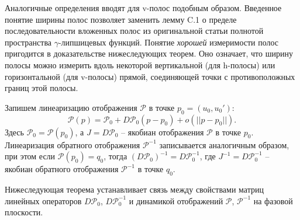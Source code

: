\documentclass{article}
\begin{document}
Аналогичные определения вводят для v-полос подобным образом.
Введенное понятие ширины полос позволяет заменить лемму C.1 о пределе последовательности вложенных полос из оригинальной статьи \cite{ref:alfimov-avramenko-2013} полнотой пространства $\gamma$-липшицевых функций.
Понятие {\it хорошей} измеримости полос пригодится в доказательстве  нижеследующих теорем.
Оно означает, что ширину полосы можно измерить вдоль некоторой вертикальной (для h-полосы) или горизонтальной (для v-полосы) прямой, соединяющей точки с противоположных границ этой полосы.

Запишем линеаризацию отображения $\mathcal{P}$ в точке $p_0 = (u_0, u_0')$:
\begin{equation}
	\mathcal{P}(p) = \mathcal{P}_0 + D \mathcal{P}_0 (p - p_0) + o(||p - p_0||).
\label{eq:diff}
\end{equation}
Здесь $\mathcal{P}_0 = \mathcal{P}(p_0)$, а $J = D \mathcal{P}_0$ -- якобиан отображения $\mathcal{P}$ в точке $p_0$.
Линеаризация обратного отображения $\mathcal{P}^{-1}$ записывается аналогичным образом, при этом если $\mathcal{P}(p_0) = q_0$, тогда $(D \mathcal{P}_0)^{-1} = D \mathcal{P}_0^{-1}$, где $J^{-1} = D \mathcal{P}_0^{-1}$ -- якобиан обратного отображения $\mathcal{P}^{-1}$ в точке $q_0$.

Нижеследующая теорема устанавливает связь между свойствами матриц линейных операторов $D \mathcal{P}_0$, $D \mathcal{P}_0^{-1}$ и динамикой отображений $\mathcal{P}$, $\mathcal{P}^{-1}$ на фазовой плоскости.
\end{document}
